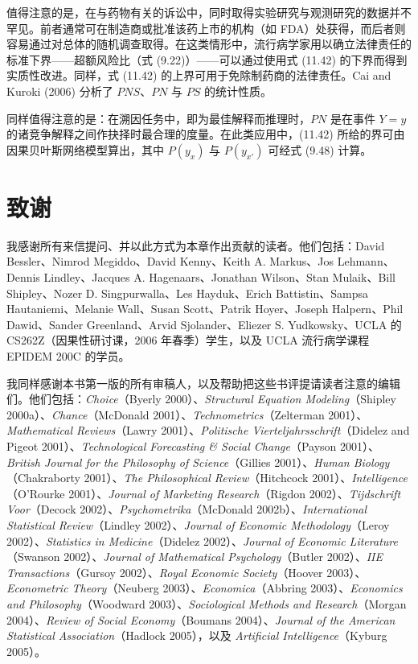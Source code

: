 值得注意的是，在与药物有关的诉讼中，同时取得实验研究与观测研究的数据并不罕见。前者通常可在制造商或批准该药上市的机构（如 FDA）处获得，而后者则容易通过对总体的随机调查取得。在这类情形中，流行病学家用以确立法律责任的标准下界——超额风险比（式 \textup{(9.22)}）——可以通过使用式 \textup{(11.42)} 的下界而得到实质性改进。同样，式 \textup{(11.42)} 的上界可用于免除制药商的法律责任。Cai and Kuroki (2006) 分析了 $PNS$、$PN$ 与 $PS$ 的统计性质。

同样值得注意的是：在溯因任务中，即为最佳解释而推理时，$PN$ 是在事件 $Y=y$ 的诸竞争解释之间作抉择时最合理的度量。在此类应用中，\textup{(11.42)} 所给的界可由因果贝叶斯网络模型算出，其中 $P(y_x)$ 与 $P(y_{x'})$ 可经式 \textup{(9.48)} 计算。

\section*{致谢}

我感谢所有来信提问、并以此方式为本章作出贡献的读者。他们包括：David Bessler、Nimrod Megiddo、David Kenny、Keith A. Markus、Jos Lehmann、Dennis Lindley、Jacques A. Hagenaars、Jonathan Wilson、Stan Mulaik、Bill Shipley、Nozer D. Singpurwalla、Les Hayduk、Erich Battistin、Sampsa Hautaniemi、Melanie Wall、Susan Scott、Patrik Hoyer、Joseph Halpern、Phil Dawid、Sander Greenland、Arvid Sjolander、Eliezer S. Yudkowsky、UCLA 的 CS262Z（因果性研讨课，2006 年春季）学生，以及 UCLA 流行病学课程 EPIDEM 200C 的学员。

我同样感谢本书第一版的所有审稿人，以及帮助把这些书评提请读者注意的编辑们。他们包括：\textit{Choice}（Byerly 2000）、\textit{Structural Equation Modeling}（Shipley 2000a）、\textit{Chance}（McDonald 2001）、\textit{Technometrics}（Zelterman 2001）、\textit{Mathematical Reviews}（Lawry 2001）、\textit{Politische Vierteljahrsschrift}（Didelez and Pigeot 2001）、\textit{Technological Forecasting \& Social Change}（Payson 2001）、\textit{British Journal for the Philosophy of Science}（Gillies 2001）、\textit{Human Biology}（Chakraborty 2001）、\textit{The Philosophical Review}（Hitchcock 2001）、\textit{Intelligence}（O'Rourke 2001）、\textit{Journal of Marketing Research}（Rigdon 2002）、\textit{Tijdschrift Voor}（Decock 2002）、\textit{Psychometrika}（McDonald 2002b）、\textit{International Statistical Review}（Lindley 2002）、\textit{Journal of Economic Methodology}（Leroy 2002）、\textit{Statistics in Medicine}（Didelez 2002）、\textit{Journal of Economic Literature}（Swanson 2002）、\textit{Journal of Mathematical Psychology}（Butler 2002）、\textit{IIE Transactions}（Gursoy 2002）、\textit{Royal Economic Society}（Hoover 2003）、\textit{Econometric Theory}（Neuberg 2003）、\textit{Economica}（Abbring 2003）、\textit{Economics and Philosophy}（Woodward 2003）、\textit{Sociological Methods and Research}（Morgan 2004）、\textit{Review of Social Economy}（Boumans 2004）、\textit{Journal of the American Statistical Association}（Hadlock 2005），以及 \textit{Artificial Intelligence}（Kyburg 2005）。

